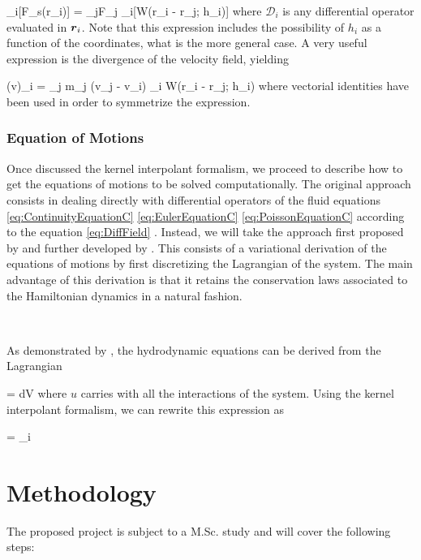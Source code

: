 \documentclass[a4,useAMS,usenatbib,usegraphicx,12pt]{article}
\begin{document}
{ _i[F_s(\bds r_i)] = \sum_jF_j 
_i[W(\bds r_i - \bds r_j; h_i)] }
where $\mathcal{D}_i$ is any differential operator evaluated in $\boldsymbol{ r }_i$. Note
that this expression includes the possibility of $h_i$ as a function of the 
coordinates, what is the more general case. A very useful expression is the 
divergence of the velocity field, yielding

{ (\nabla \cdot \bds v)_i = \sum_j m_j (\bds v_j - \bds v_i)
\cdot \nabla_i W(\bds r_i - \bds r_j; h_i) }
where vectorial identities have been used in order to symmetrize the expression.

\subsubsection*{Equation of Motions}

Once discussed the kernel interpolant formalism, we proceed to describe how to
get the equations of motions to be solved computationally. The original approach
consists in dealing directly with differential operators of the fluid equations 
\ref{eq:ContinuityEquationC} \ref{eq:EulerEquationC} \ref{eq:PoissonEquationC}
according to the equation \ref{eq:DiffField} \citep{Lucy77,Gingold77}. Instead,
we will take the approach first proposed by \citet{Gingold82} and further 
developed by \citet{Springel11}. This consists of a variational derivation of
the equations of motions by first discretizing the Lagrangian of the system. 
The main advantage of this derivation is that it retains the conservation laws
associated to the Hamiltonian dynamics in a natural fashion.

\

As demonstrated by \citet{Eckart60}, the hydrodynamic equations can be derived
from the Lagrangian

{  = \int \rho {}dV }
where $u$ carries with all the interactions of the system. Using the kernel 
interpolant formalism, we can rewrite this expression as

{  = \sum_i  }

\section{Methodology}
The proposed project is subject to a M.Sc. study and will cover the following 
steps:
\end{document}
